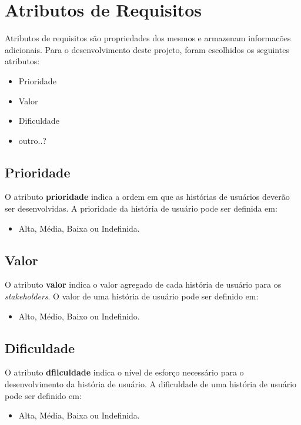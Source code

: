 \section{Atributos de Requisitos}
	Atributos de requisitos são propriedades dos mesmos e armazenam informacões adicionais. Para o desenvolvimento deste projeto, foram escolhidos os seguintes atributos:
	\begin{itemize}
		\item Prioridade
		\item Valor
		\item Dificuldade
		\item outro..?
	\end{itemize}

	\subsection{Prioridade}
	O atributo \textbf{prioridade} indica a ordem em que as histórias de usuários deverão ser desenvolvidas. A prioridade da história de usuário pode ser definida em:
	\begin{itemize}
		\item Alta, Média, Baixa ou Indefinida.
	\end{itemize}

	\subsection{Valor}
	O atributo \textbf{valor} indica o valor agregado de cada história de usuário para os \textit{stakeholders}. O valor de uma história de usuário pode ser definido em:
	\begin{itemize}
		\item Alto, Médio, Baixo ou Indefinido.
	\end{itemize}
	\subsection{Dificuldade}
	O atributo \textbf{dfilculdade} indica o nível de esforço necessário para o desenvolvimento da história de usuário. A dificuldade de uma história de usuário pode ser definido em:
	\begin{itemize}
		\item Alta, Média, Baixa ou Indefinida.
	\end{itemize}

	
